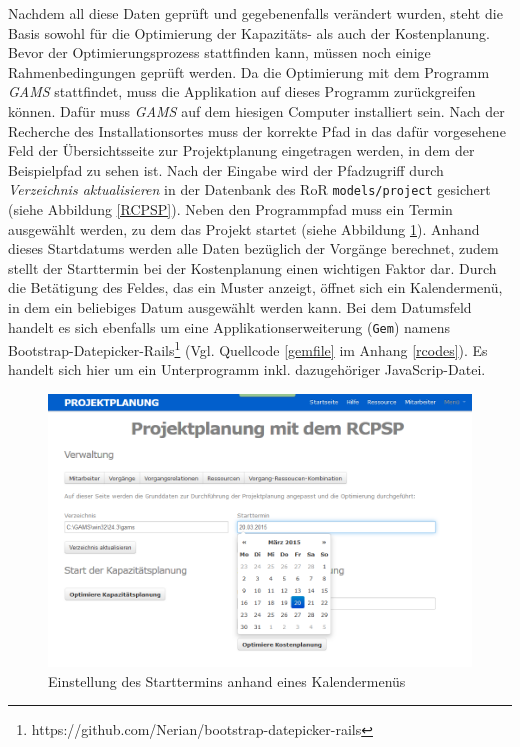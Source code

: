 \documentclass[a4paper,12pt,parskip,bibtotoc,liststotoc]{article}
\begin{document}
Nachdem all diese Daten geprüft und gegebenenfalls verändert wurden, steht die Basis sowohl für die Optimierung der Kapazitäts- als auch der Kostenplanung. Bevor der Optimierungsprozess stattfinden kann, müssen noch einige Rahmenbedingungen geprüft werden. Da die Optimierung mit dem Programm \textit{GAMS} stattfindet, muss die Applikation auf dieses Programm zurückgreifen können. Dafür muss \textit{GAMS} auf dem hiesigen Computer installiert sein. Nach der Recherche des Installationsortes muss der korrekte Pfad in das dafür vorgesehene Feld der Übersichtsseite zur Projektplanung eingetragen werden, in dem der Beispielpfad zu sehen ist. Nach der Eingabe wird der Pfadzugriff durch \textit{Verzeichnis aktualisieren} in der Datenbank des RoR \texttt{models/project} gesichert (siehe Abbildung \ref{RCPSP}). Neben den Programmpfad muss ein Termin ausgewählt werden, zu dem das Projekt startet (siehe Abbildung \ref{Startdatum}). Anhand dieses Startdatums werden alle Daten bezüglich der Vorgänge berechnet, zudem stellt der Starttermin bei der Kostenplanung einen wichtigen Faktor dar. Durch die Betätigung des Feldes, das ein Muster anzeigt, öffnet sich ein Kalendermenü, in dem ein beliebiges Datum ausgewählt werden kann. Bei dem Datumsfeld handelt es sich ebenfalls um eine Applikationserweiterung (\texttt{Gem}) namens \glqq Bootstrap-Datepicker-Rails\grqq\footnote{https://github.com/Nerian/bootstrap-datepicker-rails} (Vgl. Quellcode \ref{gemfile} im Anhang \ref{rcodes}). Es handelt sich hier um ein Unterprogramm inkl. dazugehöriger JavaScrip-Datei. \\  

\begin{figure}[h!]
  \begin{center}
    \includegraphics[width=120mm]{Bilder/Projektplanung_Datum.png}
    \caption{Einstellung des Starttermins anhand eines Kalendermenüs}  \label{Startdatum}
  \end{center}
\end{figure}
\end{document}
